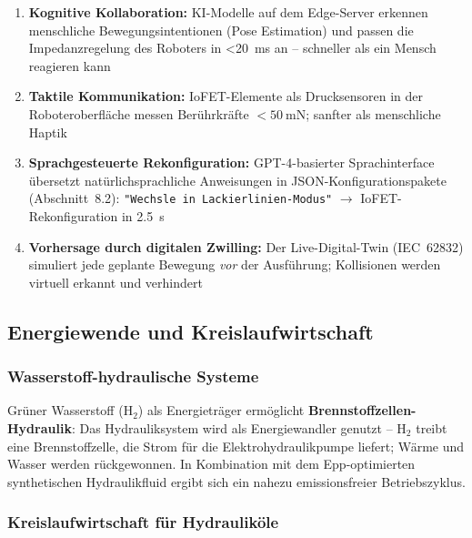 ﻿\documentclass[a4paper,12pt]{scrreprt}
\theoremstyle{definition}
\begin{document}
\begin{enumerate}
  \item \textbf{Kognitive Kollaboration:} KI-Modelle auf dem Edge-Server
        erkennen menschliche Bewegungsintentionen (Pose Estimation) und
        passen die Impedanzregelung des Roboters in \SI{<20}{\milli\second}
        an -- schneller als ein Mensch reagieren kann
  \item \textbf{Taktile Kommunikation:} IoFET-Elemente als Drucksensoren
        in der Roboteroberfl\"{a}che messen Berührkräfte $<\SI{50}{\milli\newton}$;
        sanfter als menschliche Haptik
  \item \textbf{Sprachgesteuerte Rekonfiguration:} GPT-4-basierter
        Sprachinterface übersetzt natürlichsprachliche Anweisungen
        in JSON-Konfigurationspakete (Abschnitt~8.2):
        \texttt{"Wechsle in Lackierlinien-Modus"} $\rightarrow$
        IoFET-Rekonfiguration in \SI{2.5}{\second}
  \item \textbf{Vorhersage durch digitalen Zwilling:} Der Live-Digital-Twin
        (IEC~62832) simuliert jede geplante Bewegung \emph{vor}
        der Ausführung; Kollisionen werden virtuell erkannt
        und verhindert
\end{enumerate}

\subsection{Energiewende und Kreislaufwirtschaft}

\subsubsection{Wasserstoff-hydraulische Systeme}

Grüner Wasserstoff ($\mathrm{H_2}$) als Energieträger ermöglicht
\textbf{Brennstoffzellen-Hydraulik}: Das Hydrauliksystem wird als
Energiewandler genutzt -- $\mathrm{H_2}$ treibt eine Brennstoffzelle,
die Strom für die Elektrohydraulikpumpe liefert; Wärme und Wasser
werden rückgewonnen. In Kombination mit dem Epp-optimierten
synthetischen Hydraulikfluid ergibt sich ein nahezu emissionsfreier
Betriebszyklus.

\subsubsection{Kreislaufwirtschaft für Hydrauliköle}
\end{document}
